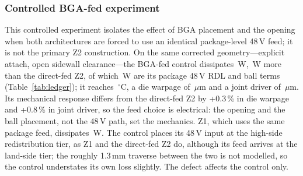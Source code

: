 \documentclass[journal]{IEEEtran}
\begin{document}
\subsubsection{Controlled BGA-fed experiment}\label{sec:control}
This controlled experiment isolates the effect of BGA placement and the opening when both
architectures are forced to use an identical package-level 48\,V feed; it is not the primary Z2
construction. On the same corrected geometry---explicit attach, open sidewall clearance---the
BGA-fed control dissipates \PlossCtrl\,W, \CtrlMinusZtwo\,W more than the direct-fed Z2, of which
\CtrlPkgHV\,W are its package 48\,V RDL and ball terms (Table~\ref{tab:ledger}); it reaches
\TmaxCtrl\,$^\circ$C, a die warpage of \WarpCtrl\,$\mu$m and a joint driver of \DuCtrl\,$\mu$m. Its mechanical response differs from the direct-fed Z2 by +0.3\,\% in die warpage and +0.8\,\% in joint driver, so the feed choice is electrical: the opening and the ball placement, not the 48\,V path, set the mechanics. Z1, which uses the same package feed, dissipates \PlossZone\,W. The
control places its 48\,V input at the
high-side redistribution tier, as Z1 and the direct-fed Z2 do, although its feed arrives at the
land-side tier; the roughly 1.3\,mm traverse between the two is not modelled, so the control
understates its own loss slightly. The defect affects the control only.
\end{document}
